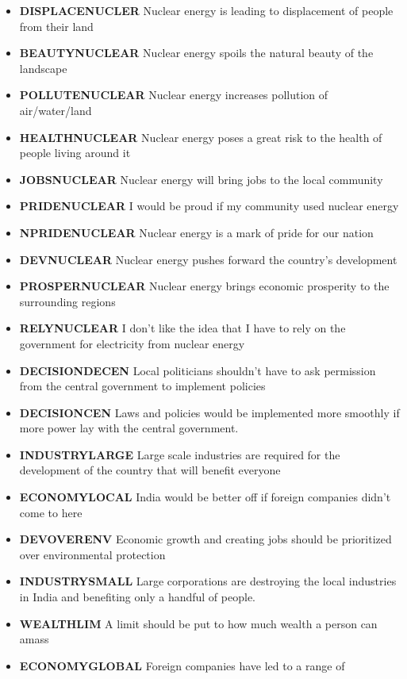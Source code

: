 \documentclass[
]{article}
\begin{document}
\begin{itemize}
\item
  \textbf{DISPLACENUCLER} Nuclear energy is leading to displacement of
  people from their land
\item
  \textbf{BEAUTYNUCLEAR} Nuclear energy spoils the natural beauty of the
  landscape
\item
  \textbf{POLLUTENUCLEAR} Nuclear energy increases pollution of
  air/water/land
\item
  \textbf{HEALTHNUCLEAR} Nuclear energy poses a great risk to the health
  of people living around it
\item
  \textbf{JOBSNUCLEAR} Nuclear energy will bring jobs to the local
  community
\item
  \textbf{PRIDENUCLEAR} I would be proud if my community used nuclear
  energy
\item
  \textbf{NPRIDENUCLEAR} Nuclear energy is a mark of pride for our
  nation
\item
  \textbf{DEVNUCLEAR} Nuclear energy pushes forward the country's
  development
\item
  \textbf{PROSPERNUCLEAR} Nuclear energy brings economic prosperity to
  the surrounding regions
\item
  \textbf{RELYNUCLEAR} I don't like the idea that I have to rely on the
  government for electricity from nuclear energy
\item
  \textbf{DECISIONDECEN} Local politicians shouldn't have to ask
  permission from the central government to implement policies
\item
  \textbf{DECISIONCEN} Laws and policies would be implemented more
  smoothly if more power lay with the central government.
\item
  \textbf{INDUSTRYLARGE} Large scale industries are required for the
  development of the country that will benefit everyone
\item
  \textbf{ECONOMYLOCAL} India would be better off if foreign companies
  didn't come to here
\item
  \textbf{DEVOVERENV} Economic growth and creating jobs should be
  prioritized over environmental protection
\item
  \textbf{INDUSTRYSMALL} Large corporations are destroying the local
  industries in India and benefiting only a handful of people.
\item
  \textbf{WEALTHLIM} A limit should be put to how much wealth a person
  can amass
\item
  \textbf{ECONOMYGLOBAL} Foreign companies have led to a range of

\end{itemize}
\end{document}

